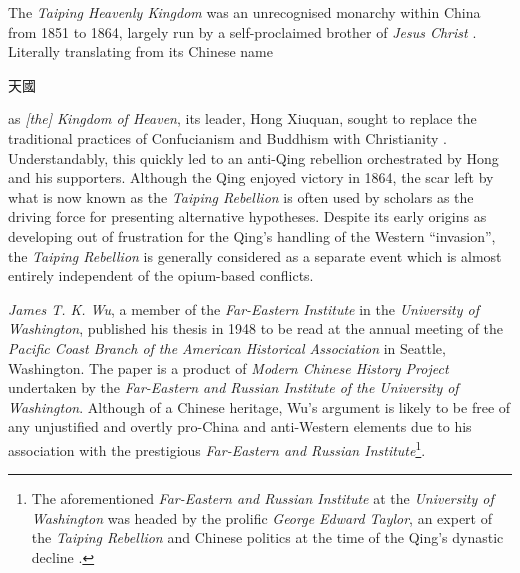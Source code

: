 \documentclass{article}
\newcommand{\zht}[1]{%
        \begin{CJK}{UTF8}{bsmi}%
                \normalfont%
                #1
        \end{CJK}
}
\begin{document}
        The \textit{Taiping Heavenly Kingdom} was an unrecognised monarchy within China from 1851 to 1864, largely run by a self-proclaimed brother of \textit{Jesus Christ} \autocites{Reilly:2014}{Yap:1954}. Literally translating from its Chinese name \zht{天國} as \textit{[the] Kingdom of Heaven}, its leader, Hong Xiuquan, sought to replace the traditional practices of Confucianism and Buddhism with Christianity \autocite{Spence:1996}. Understandably, this quickly led to an anti-Qing rebellion orchestrated by Hong and his supporters. Although the Qing enjoyed victory in 1864, the scar left by what is now known as the \textit{Taiping Rebellion} is often used by scholars as the driving force for presenting alternative hypotheses. Despite its early origins as developing out of frustration for the Qing's handling of the Western ``invasion'', the \textit{Taiping Rebellion} is generally considered as a separate event which is almost entirely independent of the opium-based conflicts.

        

        \textit{James T. K. Wu}, a member of the \textit{Far-Eastern Institute} in the \textit{University of Washington}, published his thesis in 1948 to be read at the annual meeting of the \textit{Pacific Coast Branch of the American Historical Association} in Seattle, Washington. The paper is a product of \textit{Modern Chinese History Project} undertaken by the \textit{Far-Eastern and Russian Institute of the University of Washington}. Although of a Chinese heritage, Wu's argument is likely to be free of any unjustified and overtly pro-China and anti-Western elements due to his association with the prestigious \textit{Far-Eastern and Russian Institute}\footnote{The aforementioned \textit{Far-Eastern and Russian Institute} at the \textit{University of Washington} was headed by the prolific \textit{George Edward Taylor}, an expert of the \textit{Taiping Rebellion} and Chinese politics at the time of the Qing's dynastic decline \autocite{Taylor:1999}.}.
\end{document}

